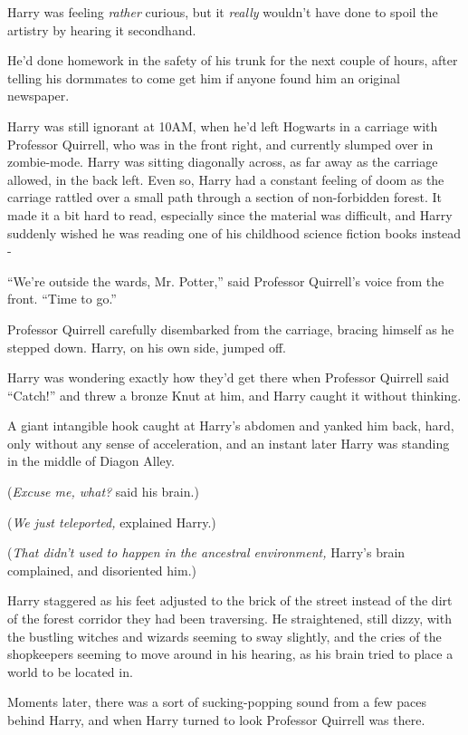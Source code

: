 Harry was feeling \emph{rather} curious, but it \emph{really} wouldn't
have done to spoil the artistry by hearing it secondhand.

He'd done homework in the safety of his trunk for the next couple of
hours, after telling his dormmates to come get him if anyone found him
an original newspaper.

Harry was still ignorant at 10AM, when he'd left Hogwarts in a carriage
with Professor Quirrell, who was in the front right, and currently
slumped over in zombie-mode. Harry was sitting diagonally across, as far
away as the carriage allowed, in the back left. Even so, Harry had a
constant feeling of doom as the carriage rattled over a small path
through a section of non-forbidden forest. It made it a bit hard to
read, especially since the material was difficult, and Harry suddenly
wished he was reading one of his childhood science fiction books instead
-

``We're outside the wards, Mr. Potter,'' said Professor Quirrell's voice
from the front. ``Time to go.''

Professor Quirrell carefully disembarked from the carriage, bracing
himself as he stepped down. Harry, on his own side, jumped off.

Harry was wondering exactly how they'd get there when Professor Quirrell
said ``Catch!'' and threw a bronze Knut at him, and Harry caught it
without thinking.

A giant intangible hook caught at Harry's abdomen and yanked him back,
hard, only without any sense of acceleration, and an instant later Harry
was standing in the middle of Diagon Alley.

(\emph{Excuse me, what?} said his brain.)

(\emph{We just teleported,} explained Harry.)

(\emph{That didn't used to happen in the ancestral environment,} Harry's
brain complained, and disoriented him.)

Harry staggered as his feet adjusted to the brick of the street instead
of the dirt of the forest corridor they had been traversing. He
straightened, still dizzy, with the bustling witches and wizards seeming
to sway slightly, and the cries of the shopkeepers seeming to move
around in his hearing, as his brain tried to place a world to be located
in.

Moments later, there was a sort of sucking-popping sound from a few
paces behind Harry, and when Harry turned to look Professor Quirrell was
there.

